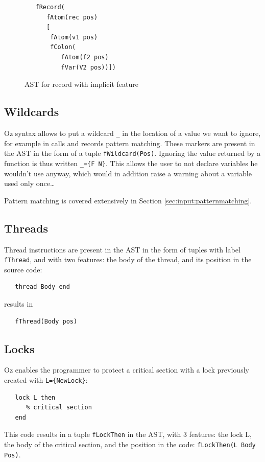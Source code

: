 \documentclass[a4paper]{memoir}
\begin{document}
\begin{figure}[h]
\begin{lstlisting}
   fRecord(
      fAtom(rec pos)
      [
       fAtom(v1 pos)
       fColon(
          fAtom(f2 pos)
          fVar(V2 pos))])
\end{lstlisting}
\caption{AST for record with implicit feature}
\label{fig:astfeature}
\end{figure}



\subsection{Wildcards}\label{sec:input:wildcard}
Oz syntax allows to put a wildcard \lstinline!_! in the location of a value we want to ignore, for example in calls and records pattern matching. These markers are present in the AST in the form of a tuple \lstinline!fWildcard(Pos)!.
Ignoring the value returned by a function is thus written \lstinline!_={F N}!. 
This allows the user to not declare variables he wouldn't use anyway, which would in addition raise a warning about a variable used only once\ldots

Pattern matching is covered extensively in Section \ref{sec:input:patternmatching}.

\subsection{Threads}
Thread instructions are present in the AST in the form of tuples with label \lstinline!fThread!, and with two features: the body of the thread, and its position in the source code:
\begin{lstlisting}
   thread Body end
\end{lstlisting}
results in
\begin{lstlisting}
   fThread(Body pos)
\end{lstlisting}
\subsection{Locks}\label{sec:input:locks}
Oz enables the programmer to protect a critical section with a lock previously created with \lstinline!L={NewLock}!:
\begin{lstlisting}
   lock L then
      % critical section
   end
\end{lstlisting}

This code results in a tuple \lstinline!fLockThen! in the AST, with 3 features: the lock L,
the body of the critical section, and the position in the code:
\lstinline!fLockThen(L Body Pos)!.
\end{document}
